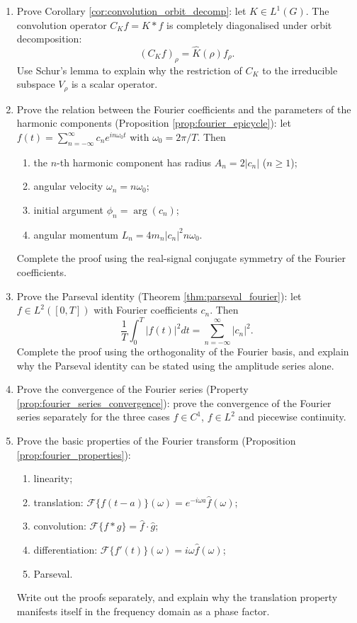\begin{enumerate}[leftmargin=3em, label=\textbf{Exercise \arabic*}]
    \item Prove Corollary \ref{cor:convolution_orbit_decomp}:
    let $K\in L^1(G)$. The convolution operator $C_Kf=K*f$ is completely diagonalised under orbit decomposition:
    \[
    (C_Kf)_\rho=\hat{K}(\rho)f_\rho.
    \]
    Use Schur's lemma to explain why the restriction of $C_K$ to the irreducible subspace $V_\rho$ is a scalar operator.

    \item Prove the relation between the Fourier coefficients and the parameters of the harmonic components (Proposition \ref{prop:fourier_epicycle}):
    let $f(t)=\sum_{n=-\infty}^{\infty}c_ne^{in\omega_0t}$ with $\omega_0=2\pi/T$. Then
    \begin{enumerate}[label=(\roman*)]
        \item the $n$-th harmonic component has radius $A_n=2|c_n|$ ($n\ge1$);
        \item angular velocity $\omega_n=n\omega_0$;
        \item initial argument $\phi_n=\arg(c_n)$;
        \item angular momentum $L_n=4m_n|c_n|^2n\omega_0$.
    \end{enumerate}
    Complete the proof using the real-signal conjugate symmetry of the Fourier coefficients.

    \item Prove the Parseval identity (Theorem \ref{thm:parseval_fourier}):
    let $f\in L^2([0,T])$ with Fourier coefficients $c_n$. Then
    \[
    \frac{1}{T}\int_0^T|f(t)|^2dt=\sum_{n=-\infty}^{\infty}|c_n|^2.
    \]
    Complete the proof using the orthogonality of the Fourier basis,
    and explain why the Parseval identity can be stated using the amplitude series alone.

    \item Prove the convergence of the Fourier series (Property \ref{prop:fourier_series_convergence}):
    prove the convergence of the Fourier series separately for the three cases $f\in C^1$, $f\in L^2$ and piecewise continuity.

    \item Prove the basic properties of the Fourier transform (Proposition \ref{prop:fourier_properties}):
    \begin{enumerate}[label=(\roman*)]
        \item linearity;
        \item translation: $\mathcal{F}\{f(t-a)\}(\omega)=e^{-i\omega a}\hat{f}(\omega)$;
        \item convolution: $\mathcal{F}\{f*g\}=\hat{f}\cdot\hat{g}$;
        \item differentiation: $\mathcal{F}\{f'(t)\}(\omega)=i\omega\hat{f}(\omega)$;
        \item Parseval.
    \end{enumerate}
    Write out the proofs separately, and explain why the translation property manifests itself in the frequency domain as a phase factor.


\end{enumerate}
